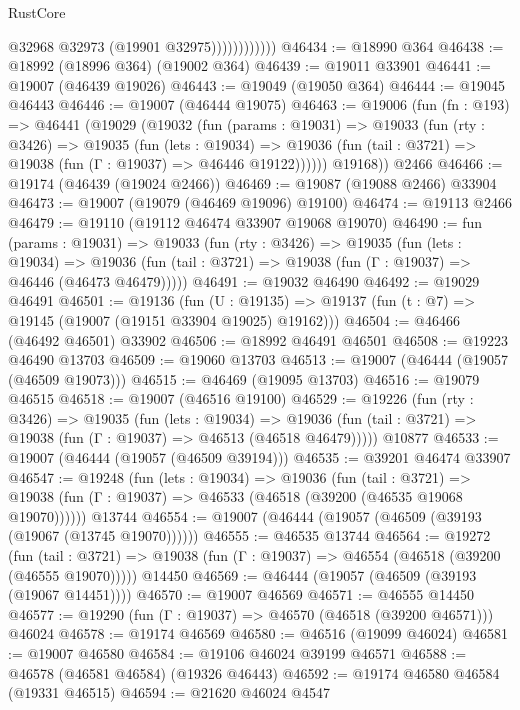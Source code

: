 \begin{lexlean}{RustCore}
\begin{coremodule}
                          @32968
                          @32973
                          (@19901 @32975))))))))))))
@46434 := @18990 @364
@46438 := @18992 (@18996 @364) (@19002 @364)
@46439 := @19011 @33901
@46441 := @19007 (@46439 @19026)
@46443 := @19049 (@19050 @364)
@46444 := @19045 @46443
@46446 := @19007 (@46444 @19075)
@46463 := @19006
    (fun (fn : @193) =>
    @46441
      (@19029
        (@19032
          (fun (params : @19031) =>
          @19033
            (fun (rty : @3426) =>
            @19035
              (fun (lets : @19034) =>
              @19036 (fun (tail : @3721) => @19038 (fun (Γ : @19037) => @46446 @19122))))))
        @19168))
    @2466
@46466 := @19174 (@46439 (@19024 @2466))
@46469 := @19087 (@19088 @2466) @33904
@46473 := @19007 (@19079 (@46469 @19096) @19100)
@46474 := @19113 @2466
@46479 := @19110 (@19112 @46474 @33907 @19068 @19070)
@46490 := fun (params : @19031) =>
  @19033
    (fun (rty : @3426) =>
    @19035
      (fun (lets : @19034) =>
      @19036 (fun (tail : @3721) => @19038 (fun (Γ : @19037) => @46446 (@46473 @46479)))))
@46491 := @19032 @46490
@46492 := @19029 @46491
@46501 := @19136
    (fun (U : @19135) => @19137 (fun (t : @7) => @19145 (@19007 (@19151 @33904 @19025) @19162)))
@46504 := @46466 (@46492 @46501) @33902
@46506 := @18992 @46491 @46501
@46508 := @19223 @46490 @13703
@46509 := @19060 @13703
@46513 := @19007 (@46444 (@19057 (@46509 @19073)))
@46515 := @46469 (@19095 @13703)
@46516 := @19079 @46515
@46518 := @19007 (@46516 @19100)
@46529 := @19226
    (fun (rty : @3426) =>
    @19035
      (fun (lets : @19034) =>
      @19036 (fun (tail : @3721) => @19038 (fun (Γ : @19037) => @46513 (@46518 @46479)))))
    @10877
@46533 := @19007 (@46444 (@19057 (@46509 @39194)))
@46535 := @39201 @46474 @33907
@46547 := @19248
    (fun (lets : @19034) =>
    @19036
      (fun (tail : @3721) =>
      @19038 (fun (Γ : @19037) => @46533 (@46518 (@39200 (@46535 @19068 @19070))))))
    @13744
@46554 := @19007 (@46444 (@19057 (@46509 (@39193 (@19067 (@13745 @19070))))))
@46555 := @46535 @13744
@46564 := @19272
    (fun (tail : @3721) => @19038 (fun (Γ : @19037) => @46554 (@46518 (@39200 (@46555 @19070)))))
    @14450
@46569 := @46444 (@19057 (@46509 (@39193 (@19067 @14451))))
@46570 := @19007 @46569
@46571 := @46555 @14450
@46577 := @19290 (fun (Γ : @19037) => @46570 (@46518 (@39200 @46571))) @46024
@46578 := @19174 @46569
@46580 := @46516 (@19099 @46024)
@46581 := @19007 @46580
@46584 := @19106 @46024 @39199 @46571
@46588 := @46578 (@46581 @46584) (@19326 @46443)
@46592 := @19174 @46580 @46584 (@19331 @46515)
@46594 := @21620 @46024 @4547

\end{coremodule}
\end{lexlean}
